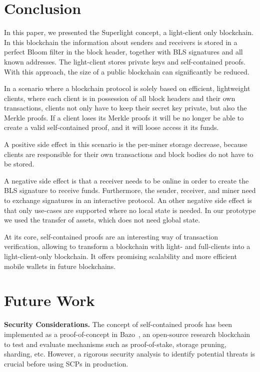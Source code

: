 \documentclass[conference]{IEEEtran}
\begin{document}
\section{Conclusion}
In this paper, we presented the Superlight concept, a light-client only blockchain. In this blockchain the information about senders and receivers is stored in a perfect Bloom filter in the block header, together with BLS signatures and all known addresses. The light-client stores private keys and self-contained proofs. With this approach, the size of a public blockchain can significantly be reduced.

In a scenario where a blockchain protocol is solely based on efficient, lightweight clients, where each client is in possession of all block headers and their own transactions, clients not only have to keep their secret key private, but also the Merkle proofs. If a client loses its Merkle proofs it will be no longer be able to create a valid self-contained proof, and it will loose access it its funds.

A positive side effect in this scenario is the per-miner storage decrease, because clients are responsible for their own transactions and block bodies do not have to be stored.

A negative side effect is that a receiver needs to be online in order to create the BLS signature to receive funds. Furthermore, the sender, receiver, and miner need to exchange signatures in an interactive protocol. An other negative side effect is that only use-cases are supported where no local state is needed. In our prototype we used the transfer of assets, which does not need global state. 

At its core, self-contained proofs are an interesting way of transaction verification, allowing to transform a blockchain with light- and full-clients into a light-client-only blockchain. It offers promising scalability and more efficient mobile wallets in future blockchains.

\section{Future Work}

\textbf{Security Considerations.} The concept of self-contained proofs has been implemented as a proof-of-concept in Bazo~\cite{Bazo}, an open-source research blockchain to test and evaluate mechanisms such as proof-of-stake, storage pruning, sharding, etc. However, a rigorous security analysis to identify potential threats is crucial before using SCPs in production.
\end{document}

